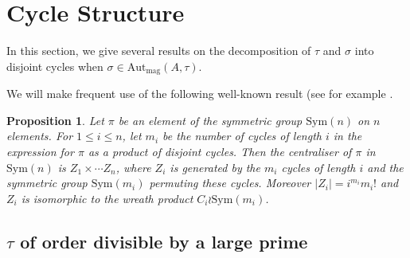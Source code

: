 \documentclass[letterpaper,12pt]{amsart}
\numberwithin{equation}{section}
\numberwithin{algorithm}{section}
\newtheorem{proposition}[lemma]{Proposition}
\theoremstyle{definition}
\newtheorem{remark}[lemma]{Remark}
\newcommand{\Sym}{\mathrm{Sym}}
\newcommand{\Autmag}{\mathrm{Aut}_\mathrm{mag}}
\begin{document}

\section{Cycle Structure}
In this section, we give several results on the decomposition of $\tau$ and $\sigma$ into disjoint cycles when $\sigma \in \Autmag(A,\tau)$. 

We will make frequent use of the following well-known result (see for example \cite[Proposition 1.1.1]{Sagan}.

\begin{proposition} \label{perm-comm}
Let $\pi$ be an element of the symmetric group $\Sym(n)$ on $n$ elements. For $1 \leq i \leq n$, let $m_i$ be the number of cycles of length $i$ in the expression for $\pi$ as a product of disjoint cycles. Then the centraliser of $\pi$ in $\Sym(n)$ is $Z_1 \times \cdots Z_n$, where $Z_i$ is generated by the $m_i$ cycles of length $i$ and the symmetric group $\Sym(m_i)$ permuting these cycles. Moreover $|Z_i| = i^{m_i} m_i!$ and $Z_i$ is isomorphic to the wreath product $C_i \wr \Sym(m_i)$. 
\end{proposition}

\subsection{$\tau$ of order divisible by a large prime}
\end{document}
